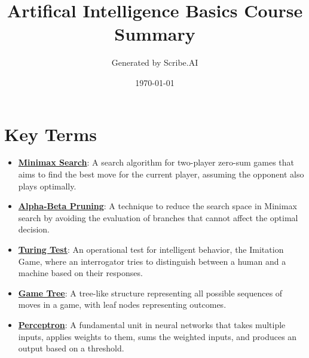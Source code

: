 \documentclass{article}%
\title{Artifical Intelligence Basics Course Summary}%
\author{Generated by Scribe.AI}%
\date{\today}%
\begin{document}
%
\normalsize%
\maketitle%
\section{Key Terms}%
\label{sec:KeyTerms}%
\begin{itemize}[leftmargin=*]%
\item \href{https://purdue.brightspace.com/d2l/common/assets/pdfjs-d2l-dist/1.0.14-legacy/web/viewer.html?file=\%2Fcontent\%2Fenforced\%2F1095467-wl.202510.CS.24300.001\%2F02L2-Intro.pdf\%3Fou\%3D1095467\&lang=en-us\&container=d2l-fileviewer-rendered-pdf\&fullscreen=d2l-fileviewer-rendered-pdf-dialog\&height=667#page=22}{\textbf{Minimax Search}}: A search algorithm for two-player zero-sum games that aims to find the best move for the current player, assuming the opponent also plays optimally.%
\item \href{https://purdue.brightspace.com/d2l/common/assets/pdfjs-d2l-dist/1.0.14-legacy/web/viewer.html?file=\%2Fcontent\%2Fenforced\%2F1095467-wl.202510.CS.24300.001\%2F02L2-Intro.pdf\%3Fou\%3D1095467\&lang=en-us\&container=d2l-fileviewer-rendered-pdf\&fullscreen=d2l-fileviewer-rendered-pdf-dialog\&height=667#page=23}{\textbf{Alpha{-}Beta Pruning}}: A technique to reduce the search space in Minimax search by avoiding the evaluation of branches that cannot affect the optimal decision.%
\item \href{https://purdue.brightspace.com/d2l/common/assets/pdfjs-d2l-dist/1.0.14-legacy/web/viewer.html?file=\%2Fcontent\%2Fenforced\%2F1095467-wl.202510.CS.24300.001\%2F02L2-Intro.pdf\%3Fou\%3D1095467\&lang=en-us\&container=d2l-fileviewer-rendered-pdf\&fullscreen=d2l-fileviewer-rendered-pdf-dialog\&height=667#page=6}{\textbf{Turing Test}}: An operational test for intelligent behavior, the Imitation Game, where an interrogator tries to distinguish between a human and a machine based on their responses.%
\item \href{https://purdue.brightspace.com/d2l/common/assets/pdfjs-d2l-dist/1.0.14-legacy/web/viewer.html?file=\%2Fcontent\%2Fenforced\%2F1095467-wl.202510.CS.24300.001\%2F02L2-Intro.pdf\%3Fou\%3D1095467\&lang=en-us\&container=d2l-fileviewer-rendered-pdf\&fullscreen=d2l-fileviewer-rendered-pdf-dialog\&height=667#page=11}{\textbf{Game Tree}}: A tree-like structure representing all possible sequences of moves in a game, with leaf nodes representing outcomes.%
\item \href{https://purdue.brightspace.com/d2l/common/assets/pdfjs-d2l-dist/1.0.14-legacy/web/viewer.html?file=\%2Fcontent\%2Fenforced\%2F1095467-wl.202510.CS.24300.001\%2F02L2-Intro.pdf\%3Fou\%3D1095467\&lang=en-us\&container=d2l-fileviewer-rendered-pdf\&fullscreen=d2l-fileviewer-rendered-pdf-dialog\&height=667#page=45}{\textbf{Perceptron}}: A fundamental unit in neural networks that takes multiple inputs, applies weights to them, sums the weighted inputs, and produces an output based on a threshold.%

\end{itemize}
\end{document}
